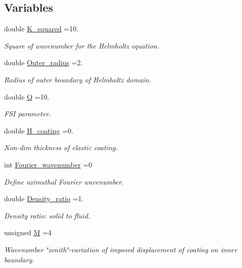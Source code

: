 \subsection*{Variables}
\begin{DoxyCompactItemize}
\item 
double \hyperlink{namespaceGlobal__Parameters_a91a3fa265abaf9e724c668ee800ffb29}{K\+\_\+squared} =10.
\begin{DoxyCompactList}\small\item\em Square of wavenumber for the Helmholtz equation. \end{DoxyCompactList}\item 
double \hyperlink{namespaceGlobal__Parameters_a88ded445ecd7bd89701409e68fd0b900}{Outer\+\_\+radius} =2.
\begin{DoxyCompactList}\small\item\em Radius of outer boundary of Helmholtz domain. \end{DoxyCompactList}\item 
double \hyperlink{namespaceGlobal__Parameters_a7814fddf663e56168174a42d2cd6b4c1}{Q} =10.
\begin{DoxyCompactList}\small\item\em F\+SI parameter. \end{DoxyCompactList}\item 
double \hyperlink{namespaceGlobal__Parameters_ae3cf8878ede839bffda01f79bbe3e819}{H\+\_\+coating} =0.
\begin{DoxyCompactList}\small\item\em Non-\/dim thickness of elastic coating. \end{DoxyCompactList}\item 
int \hyperlink{namespaceGlobal__Parameters_ae1198385d90f52c4ed921520ae43a9e7}{Fourier\+\_\+wavenumber} =0
\begin{DoxyCompactList}\small\item\em Define azimuthal Fourier wavenumber. \end{DoxyCompactList}\item 
double \hyperlink{namespaceGlobal__Parameters_a517d4c31b8bce6563c2f605266dd9679}{Density\+\_\+ratio} =1.
\begin{DoxyCompactList}\small\item\em Density ratio\+: solid to fluid. \end{DoxyCompactList}\item 
unsigned \hyperlink{namespaceGlobal__Parameters_abc67bb72ab99af013e3c7f6ffe453798}{M} =4
\begin{DoxyCompactList}\small\item\em Wavenumber \char`\"{}zenith\char`\"{}-\/variation of imposed displacement of coating on inner boundary. \end{DoxyCompactList}\item 

\end{DoxyCompactItemize}
